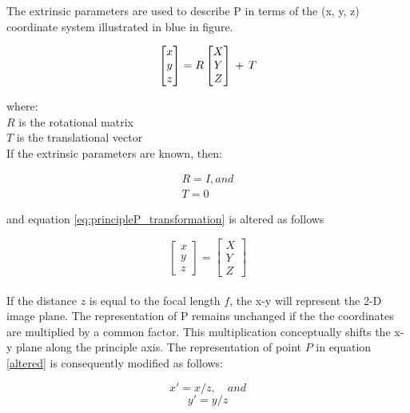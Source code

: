 The extrinsic parameters are used to describe P in terms of the (x, y, z) coordinate system illustrated in blue in figure.

\begin{equation}\label{eq:principleP_transformation}
\begin{bmatrix}{x}\\{y}\\{z}\end{bmatrix} = R  \begin{bmatrix}{X}\\{Y}\\{Z}\end{bmatrix}\,+\,T\\
\end{equation}

where:\\
$R$ is the rotational matrix\\
$T$ is the translational vector\\

If the extrinsic parameters are known, then:

\begin{align*}
R = I, and\\
T = 0
\end{align*}

and equation \ref{eq:principleP_transformation} is altered as follows 

\begin{equation}\label{altered}
\begin{bmatrix}{x}\\{y}\\{z}\end{bmatrix} =  \begin{bmatrix}{X}\\{Y}\\{Z}\end{bmatrix}
\end{equation}\\

If the distance $z$ is equal to the focal length $f$, the x-y will represent the 2-D image plane. The representation of P remains unchanged if the the coordinates are multiplied by a common factor. This multiplication conceptually shifts the x-y plane along the principle axis. The representation of point $P$ in equation \ref{altered} is consequently modified as follows:

\begin{equation}x' = x/z,\quad and \end{equation}
\begin{equation}y' = y/z \end{equation}

